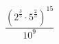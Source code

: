 \begin{ex}
	\begin{condition}
		\( \dfrac{(2^{\frac{3}{5}}\cdot5^{\frac{2}{3}})^{15}}{10^9} \)
	\end{condition}
\end{ex}